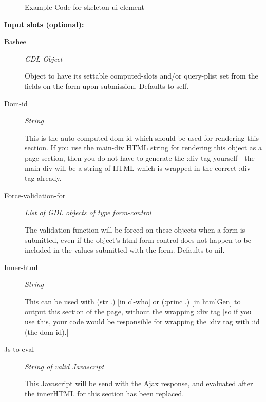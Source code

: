\documentclass [11pt]{book}
\begin{document}
\begin{itemize}
\begin{figure}
\caption{Example Code for skeleton-ui-element}

\label{fig:example-code-skeleton-ui-element}

\end{figure}





\textbf{
\underline{Input slots (optional):}}

\begin{description}

\item [Bashee]
\emph{GDL Object}

 Object to have its settable computed-slots and/or query-plist set
from the fields on the form upon submission. Defaults to self.




\item [Dom-id]
\emph{String}

 This is the auto-computed dom-id which should be used for rendering
this section. If you use the main-div HTML string for rendering this object as a
page section, then you do not have to generate the :div tag yourself - the main-div
will be a string of HTML which is wrapped in the correct :div tag already.




\item [Force-validation-for]
\emph{List of GDL objects of type form-control}

 The validation-function will be forced
on these objects when a form is submitted, even if the object's html form-control does
not happen to be included in the values submitted with the form. Defaults to nil.




\item [Inner-html]
\emph{String}

 This can be used with (str .) [in cl-who] or (:princ .) [in htmlGen]
to output this section of the page, without the wrapping :div tag [so if you use this,
your code would be responsible for wrapping the :div tag with :id (the dom-id).]




\item [Js-to-eval]
\emph{String of valid Javascript}

 This Javascript will be send with the Ajax response,
and evaluated after the innerHTML for this section has been replaced.





\end{description}
\end{itemize}
\end{document}

